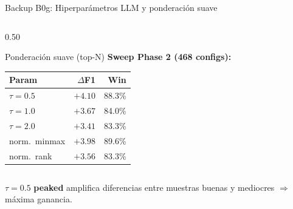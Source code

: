 \begin{frame}{Backup B0g: Hiperparámetros LLM y ponderación suave}
\begin{columns}[T]
\begin{column}{0.50\textwidth}
\begin{block}{Ponderación suave (top-N)}
\vspace{0.1em}
\textbf{Sweep Phase 2 (468 configs):}
\begin{tabular}{@{}lrr@{}}
\toprule
Param          & $\Delta$F1 & Win \\
\midrule
$\tau=0.5$     & \alert{$+4.10$} & 88.3\% \\
$\tau=1.0$     & $+3.67$         & 84.0\% \\
$\tau=2.0$     & $+3.41$         & 83.3\% \\
norm.\ minmax  & \alert{$+3.98$} & 89.6\% \\
norm.\ rank    & $+3.56$         & 83.3\% \\
\bottomrule
\end{tabular}
\end{block}
\end{column}

\end{columns}

\begin{insight}
\scriptsize $\tau{=}0.5$ \textbf{peaked} amplifica diferencias entre muestras buenas y mediocres $\Rightarrow$ máxima ganancia.
\end{insight}
\end{frame}


